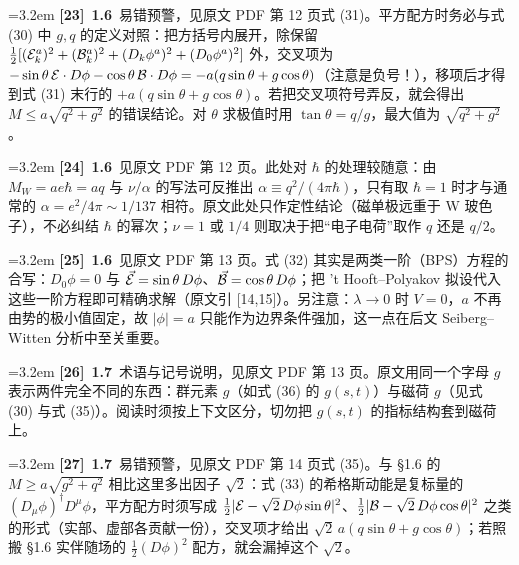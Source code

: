 \par
\par\medskip\noindent\hangindent=3.2em \textbf{[23]}~\textbf{1.6}~易错预警，见原文 PDF 第 12 页式 (31)。平方配方时务必与式 (30) 中 $g,q$ 的定义对照：把方括号内展开，除保留 $\frac12[({\cal E}^a_k)^2+({\cal B}^a_k)^2+(D_k\phi^a)^2+(D_0\phi^a)^2]$ 外，交叉项为 $-\sin\theta\,{\cal E}\cdot D\phi-\cos\theta\,{\cal B}\cdot D\phi=-a(q\sin\theta+g\cos\theta)$（注意是负号！），移项后才得到式 (31) 末行的 $+a(q\sin\theta+g\cos\theta)$。若把交叉项符号弄反，就会得出 $M\le a\sqrt{q^2+g^2}$ 的错误结论。对 $\theta$ 求极值时用 $\tan\theta=q/g$，最大值为 $\sqrt{q^2+g^2}$。
\par
\par\medskip\noindent\hangindent=3.2em \textbf{[24]}~\textbf{1.6}~见原文 PDF 第 12 页。此处对 $\hbar$ 的处理较随意：由 $M_W=ae\hbar=aq$ 与 $\nu/\alpha$ 的写法可反推出 $\alpha\equiv q^2/(4\pi\hbar)$，只有取 $\hbar=1$ 时才与通常的 $\alpha=e^2/4\pi\sim1/137$ 相符。原文此处只作定性结论（磁单极远重于 W 玻色子），不必纠结 $\hbar$ 的幂次；$\nu=1$ 或 $1/4$ 则取决于把“电子电荷”取作 $q$ 还是 $q/2$。
\par
\par\medskip\noindent\hangindent=3.2em \textbf{[25]}~\textbf{1.6}~见原文 PDF 第 13 页。式 (32) 其实是两类一阶（BPS）方程的合写：$D_0\phi=0$ 与 $\vec{\cal E}=\sin\theta\,D\phi$、$\vec{\cal B}=\cos\theta\,D\phi$；把 't Hooft–Polyakov 拟设代入这些一阶方程即可精确求解（原文引 [14,15]）。另注意：$\lambda\to0$ 时 $V=0$，$a$ 不再由势的极小值固定，故 $|\phi|=a$ 只能作为边界条件强加，这一点在后文 Seiberg–Witten 分析中至关重要。
\par
\par\medskip\noindent\hangindent=3.2em \textbf{[26]}~\textbf{1.7}~术语与记号说明，见原文 PDF 第 13 页。原文用同一个字母 $g$ 表示两件完全不同的东西：群元素 $g$（如式 (36) 的 $g(s,t)$）与磁荷 $g$（见式 (30) 与式 (35)）。阅读时须按上下文区分，切勿把 $g(s,t)$ 的指标结构套到磁荷上。
\par
\par\medskip\noindent\hangindent=3.2em \textbf{[27]}~\textbf{1.7}~易错预警，见原文 PDF 第 14 页式 (35)。与 §1.6 的 $M\ge a\sqrt{g^2+q^2}$ 相比这里多出因子 $\sqrt2$：式 (33) 的希格斯动能是复标量的 $(D_\mu\phi)^\dagger D^\mu\phi$，平方配方时须写成 $\frac{1}{2}|{\cal E}-\sqrt2\,D\phi\sin\theta|^2$、$\frac{1}{2}|{\cal B}-\sqrt2\,D\phi\cos\theta|^2$ 之类的形式（实部、虚部各贡献一份），交叉项才给出 $\sqrt2\,a(q\sin\theta+g\cos\theta)$；若照搬 §1.6 实伴随场的 $\frac12(D\phi)^2$ 配方，就会漏掉这个 $\sqrt2$。
